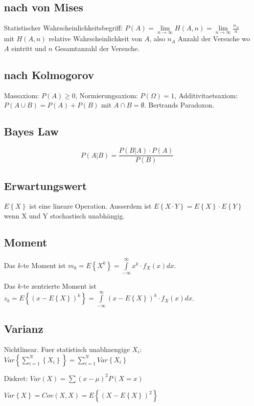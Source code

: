 \documentclass[10pt,a4paper]{article}
\begin{document}
\subsection{nach von Mises}
Statistischer Wahrscheinlichkeitsbegriff: $P(A)=\lim\limits_{n \rightarrow \infty} H(A,n)=\lim\limits_{n \rightarrow \infty} \frac{n_A}{n}$ mit $H(A,n)$ relative Wahrscheinlichkeit von $A$, also $n_A$ Anzahl der Versuche wo $A$ eintritt und $n$ Gesamtanzahl der Versuche.
\subsection{nach Kolmogorov}
Massaxiom: $P(A) \geq 0$, Normierungsaxiom: $P(\Omega)=1$, Additivitaetsaxiom: $P(A \cup B) = P(A) + P(B)$ mit $A \cap B = \emptyset$. Bertrands Paradoxon.

\subsection{Bayes Law}
\[P(A|B)= \frac{P(B|A) \cdot P(A)}{P(B)}\]

\subsection{Erwartungswert}
$E\left\{X\right\}$ ist eine lineare Operation. Ausserdem ist $E\left\{X\cdot Y\right\} = E\left\{X\right\} \cdot E\left\{Y\right\}$ wenn X und Y stochastisch unabhängig.

\subsection{Moment}
Das $k$-te Moment ist $m_k = E\left\{X^k\right\}
=
\int\limits_{-\infty}^\infty
  x^k
  \cdot
  f_X(x)
dx$.

Das $k$-te zentrierte Moment ist $z_k =
E\left\{
  (x -
  E\left\{
    X
   \right\}
  )^k
\right\}
=
\int\limits_{-\infty}^\infty
  (x -
  E\left\{
    X
   \right\}
  )^k
  \cdot
  f_X(x)
dx$.

\subsection{Varianz}
Nichtlinear. Fuer statistisch unabhaengige $X_i$: $Var\left\{ \sum\limits_{i=1}^N \left\{X_i\right\}\right\} = \sum\limits_{i=1}^N Var\left\{X_i\right\}$

Diskret: $Var(X)=\sum (x-\mu)^2 P(X=x)$

$Var\left\{ X \right\}  = Cov(X,X) = E\left\{ (X-E\left\{ X \right\})^2 \right\}$
\end{document}
